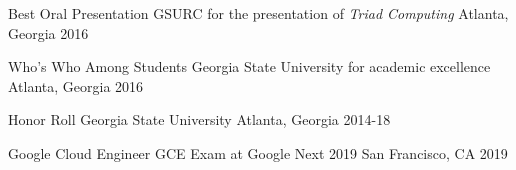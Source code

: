 




\begin{cvhonors}


\cvhonor
{Best Oral Presentation} %
{GSURC for the presentation of \em{Triad Computing}} %
{Atlanta, Georgia} %
{2016} %


\cvhonor
{Who's Who Among Students} %
{Georgia State University for academic excellence} %
{Atlanta, Georgia} %
{2016} %


\cvhonor
{Honor Roll} %
{Georgia State University} %
{Atlanta, Georgia} %
{2014-18} %


\end{cvhonors}




\begin{cvhonors}


\cvhonor
{Google Cloud Engineer} %
{GCE Exam at Google Next 2019} %
{San Francisco, CA} %
{2019} %


\end{cvhonors}
